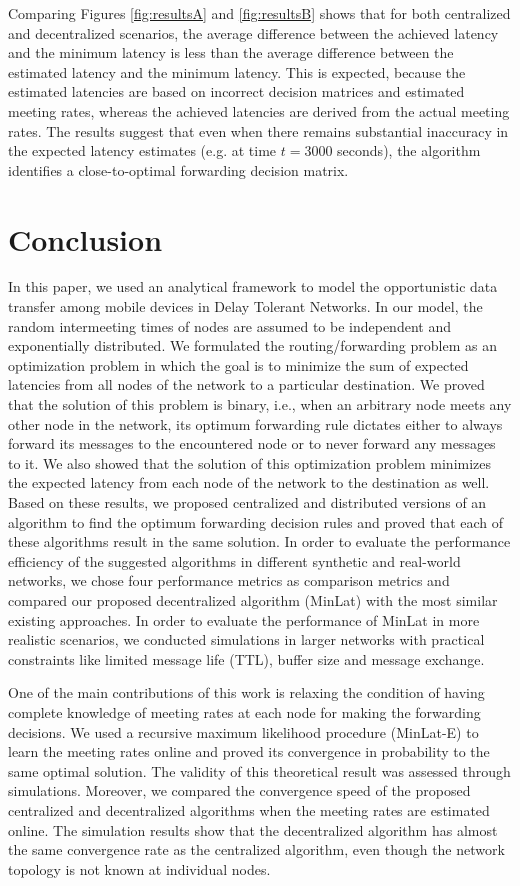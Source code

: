 \documentclass[journal,onecolumn,11pt]{IEEEtran}
\theoremstyle{plain}
\theoremstyle{definition}
\begin{document}
Comparing Figures \ref{fig:resultsA} and \ref{fig:resultsB} shows that
for both centralized and decentralized scenarios, the average
difference between the achieved latency and the minimum latency is
less than the average difference between the estimated latency and the
minimum latency. This is expected, because the estimated latencies are
based on incorrect decision matrices and estimated meeting rates,
whereas the achieved latencies are derived from the actual meeting
rates. The results suggest that even when there remains substantial
inaccuracy in the expected latency estimates (e.g. at time $t=3000$
seconds), the algorithm identifies a close-to-optimal forwarding
decision matrix.

\section{Conclusion}\label{sec:conc}
In this paper, we used an analytical framework to model the
opportunistic data transfer among mobile devices in Delay Tolerant
Networks. In our model, the random intermeeting times of nodes are
assumed to be independent and exponentially distributed. We formulated
the routing/forwarding problem as an optimization problem in which the
goal is to minimize the sum of expected latencies from all nodes of
the network to a particular destination. We proved that the solution
of this problem is binary, i.e., when an arbitrary node meets any
other node in the network, its optimum forwarding rule dictates either
to always forward its messages to the encountered node or to never
forward any messages to it. We also showed that the solution of this
optimization problem minimizes the expected latency from each node of
the network to the destination as well. Based on these results, we
proposed centralized and distributed versions of an algorithm to find
the optimum forwarding decision rules and proved that each of these
algorithms result in the same solution. In order to evaluate the
performance efficiency of the suggested algorithms in different synthetic
and real-world networks, we chose four performance metrics as
comparison metrics and compared our proposed decentralized algorithm
(MinLat) with the most similar existing approaches. In order to
evaluate the performance of MinLat in more realistic scenarios, we
conducted simulations in larger networks with practical
constraints like limited message life (TTL), buffer size and message
exchange.

One of the main contributions of this work is relaxing the condition of
having complete knowledge of meeting rates at each node for making the
forwarding decisions. We used a recursive maximum likelihood procedure
(MinLat-E) to learn the meeting rates online and proved its
convergence in probability to the same optimal solution. The validity
of this theoretical result was assessed through
simulations. Moreover, we compared the convergence speed of the
proposed centralized and decentralized algorithms when the meeting
rates are estimated online. The simulation results show that the
decentralized algorithm has almost the same convergence rate as the
centralized algorithm, even though the network topology 
is not known at individual nodes. 
\end{document}
